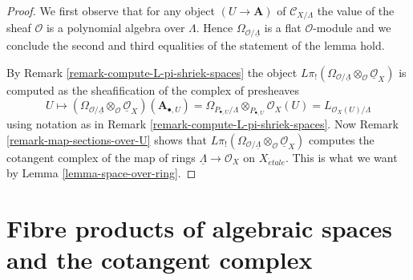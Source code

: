 \documentclass[10pt,a4paper]{article}
\theoremstyle{plain}
\theoremstyle{definition}
\theoremstyle{remark}
\numberwithin{equation}{subsection}
\def\etale{{\acute{e}tale}}
\begin{document}
\begin{proof}
We first observe that for any object $(U \to \mathbf{A})$ of
$\mathcal{C}_{X/\Lambda}$
the value of the sheaf $\mathcal{O}$ is a polynomial algebra over $\Lambda$.
Hence $\Omega_{\mathcal{O}/\underline{\Lambda}}$ is a flat $\mathcal{O}$-module
and we conclude the second and third equalities of the statement of the
lemma hold.

\medskip\noindent
By Remark \ref{remark-compute-L-pi-shriek-spaces} the object
$L\pi_!(\Omega_{\mathcal{O}/\underline{\Lambda}}
\otimes_\mathcal{O} \underline{\mathcal{O}}_X)$
is computed as the sheafification of the complex of presheaves
$$
U \mapsto
\left(\Omega_{\mathcal{O}/\underline{\Lambda}}
\otimes_\mathcal{O} \underline{\mathcal{O}}_X\right)(\mathbf{A}_{\bullet, U})
=
\Omega_{P_{\bullet, U}/\Lambda} \otimes_{P_{\bullet, U}} \mathcal{O}_X(U) =
L_{\mathcal{O}_X(U)/\Lambda}
$$
using notation as in Remark \ref{remark-compute-L-pi-shriek-spaces}.
Now Remark \ref{remark-map-sections-over-U} shows that
$L\pi_!(\Omega_{\mathcal{O}/\underline{\Lambda}}
\otimes_\mathcal{O} \underline{\mathcal{O}}_X)$
computes the cotangent complex of the map of rings
$\underline{\Lambda} \to \mathcal{O}_X$ on $X_\etale$.
This is what we want by Lemma \ref{lemma-space-over-ring}.
\end{proof}






\section{Fibre products of algebraic spaces and the cotangent complex}
\label{section-fibre-product}
\end{document}
